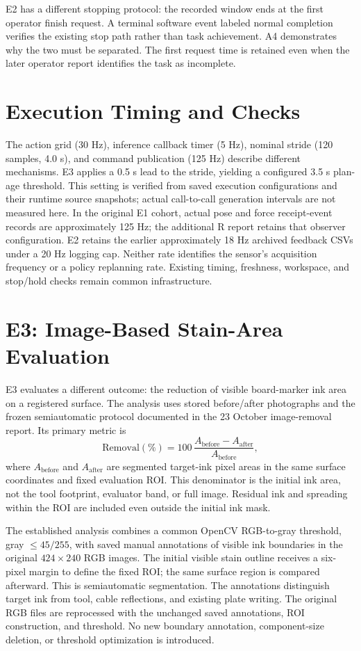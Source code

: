 E2 has a different stopping protocol: the recorded window ends at the first operator finish request. A terminal software event labeled normal completion verifies the existing stop path rather than task achievement. A4 demonstrates why the two must be separated. The first request time is retained even when the later operator report identifies the task as incomplete.

\section{Execution Timing and Checks}
The action grid (30 Hz), inference callback timer (5 Hz), nominal stride (120 samples, 4.0 s), and command publication (125 Hz) describe different mechanisms. E3 applies a 0.5 s lead to the stride, yielding a configured 3.5 s plan-age threshold. This setting is verified from saved execution configurations and their runtime source snapshots; actual call-to-call generation intervals are not measured here. In the original E1 cohort, actual pose and force receipt-event records are approximately 125 Hz; the additional R report retains that observer configuration. E2 retains the earlier approximately 18 Hz archived feedback CSVs under a 20 Hz logging cap. Neither rate identifies the sensor's acquisition frequency or a policy replanning rate. Existing timing, freshness, workspace, and stop/hold checks remain common infrastructure.

\section{E3: Image-Based Stain-Area Evaluation}
\label{sec:e3_image_method}
E3 evaluates a different outcome: the reduction of visible board-marker ink area on a registered surface. The analysis uses stored before/after photographs and the frozen semiautomatic protocol documented in the 23 October image-removal report. Its primary metric is
\begin{equation}
 \mathrm{Removal}(\%)=100\,\frac{A_{\mathrm{before}}-A_{\mathrm{after}}}{A_{\mathrm{before}}},
 \label{eq:e3_removal}
\end{equation}
where \(A_{\mathrm{before}}\) and \(A_{\mathrm{after}}\) are segmented target-ink pixel areas in the same surface coordinates and fixed evaluation ROI. This denominator is the initial ink area, not the tool footprint, evaluator band, or full image. Residual ink and spreading within the ROI are included even outside the initial ink mask.

The established analysis combines a common OpenCV RGB-to-gray threshold, gray \(\leq45/255\), with saved manual annotations of visible ink boundaries in the original \(424\times240\) RGB images. The initial visible stain outline receives a six-pixel margin to define the fixed ROI; the same surface region is compared afterward. This is semiautomatic segmentation. The annotations distinguish target ink from tool, cable reflections, and existing plate writing. The original RGB files are reprocessed with the unchanged saved annotations, ROI construction, and threshold. No new boundary annotation, component-size deletion, or threshold optimization is introduced.

